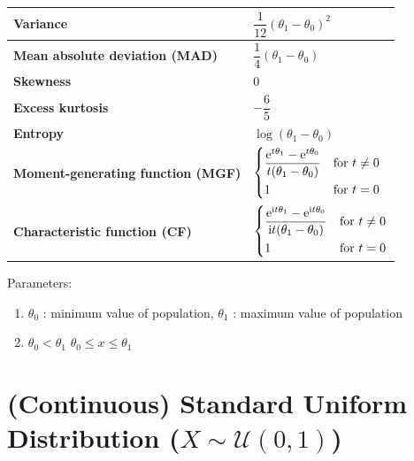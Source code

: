 \begin{customTableWrapper}{2}
\begin{longtable}{|m{6cm}|p{9cm}|}
    \textbf{Variance} &
    ${ {\dfrac {1}{12}}(\theta_1-\theta_0)^{2}}$
    \\[1ex] \hline

    \textbf{Mean absolute deviation (MAD)} &
    ${ {\dfrac {1}{4}}(\theta_1-\theta_0)}$
    \\[1ex] \hline

    \textbf{Skewness} &
    $0$
    \\ \hline

    \textbf{Excess kurtosis} &
    ${ -{\dfrac {6}{5}}}$
    \\[1ex] \hline

    \textbf{Entropy} &
    ${ \log(\theta_1-\theta_0)}$
    \\[1ex] \hline

    \textbf{Moment-generating function (MGF)} &
    ${ {\begin{dcases}{\dfrac {\mathrm {e} ^{t\theta_1}-\mathrm {e} ^{t\theta_0}}{t(\theta_1-\theta_0)}}&{\text{for }}t\neq 0\\1&{\text{for }}t=0\end{dcases}}}$
    \\[1ex] \hline

    \textbf{Characteristic function (CF)} &
    ${ {\begin{dcases}{\dfrac {\mathrm {e} ^{\mathrm {i} t\theta_1}-\mathrm {e} ^{\mathrm {i} t\theta_0}}{\mathrm {i} t(\theta_1-\theta_0)}}&{\text{for }}t\neq 0\\1&{\text{for }}t=0\end{dcases}}}$
    \\[1ex] \hline

\end{longtable}
\end{customTableWrapper}


Parameters:
\begin{enumerate}
    \item $\theta_0$ : minimum value of population, $\theta_1$ : maximum value of population

    \item 
        \hfill
        $\theta_0 < \theta_1$
        \hfill
        $\theta_0 \leq x \leq \theta_1$
        \hfill

\end{enumerate}



\section{(Continuous) Standard Uniform Distribution ($X \sim \mathcal{U}(0,1)$) \cite{ism-1}} \label{Standard Uniform Distribution}

